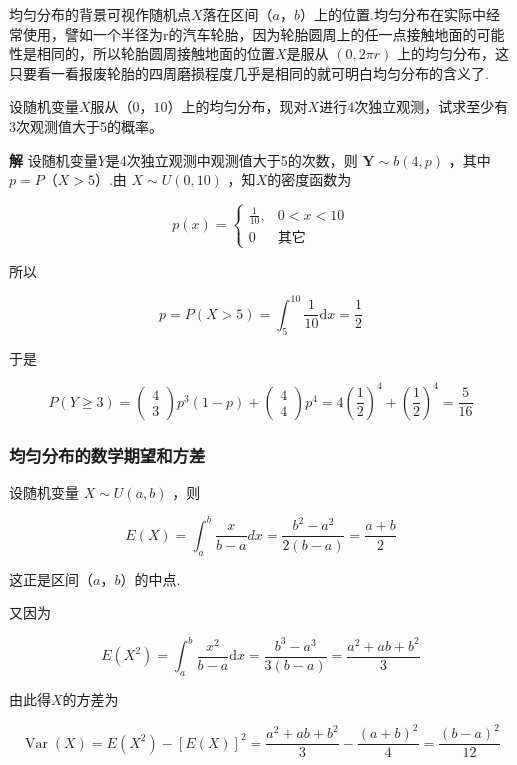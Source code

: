 均匀分布的背景可视作随机点$ X $落在区间$ （a，b） $上的位置.均匀分布在实际中经常使用，譬如一个半径为r的汽车轮胎，因为轮胎圆周上的任一点接触地面的可能性是相同的，所以轮胎圆周接触地面的位置$ X $是服从 $(0,2 \pi r)$ 上的均匀分布，这只要看一看报废轮胎的四周磨损程度几乎是相同的就可明白均匀分布的含义了.

\begin{example}
	设随机变量$ X $服从$ （0，10） $上的均匀分布，现对$ X $进行4次独立观测，试求至少有3次观测值大于5的概率。
	
	\textbf{解} 设随机变量$ Y $是4次独立观测中观测值大于5的次数，则 $\mathbf{Y} \sim b(4, p)$ ，其中$ p=P（X>5） $.由 $X \sim U(0,10)$ ，知$ X $的密度函数为
	
	\[
	p(x)=\left\{
	\begin{array}{ll}
	{\frac{1}{10},} & {0<x<10} \\ 
	{0}             & {\text{其它}}
	\end{array}\right.
	\]
	
	所以
	
	\[
	p=P(X>5)=\int_{5}^{10} \frac{1}{10} \mathrm{d} x=\frac{1}{2}
	\]
	
	于是
	
	\[
	P(Y \geqslant 3)=\left( \begin{array}{l}{4} \\ {3}\end{array}\right) p^{3}(1-p)+\left( \begin{array}{l}{4} \\ {4}\end{array}\right) p^{4}=4\left(\frac{1}{2}\right)^{4}+\left(\frac{1}{2}\right)^{4}=\frac{5}{16}
	\]
\end{example}

\subsubsection{均匀分布的数学期望和方差}

设随机变量 $X \sim U(a, b)$ ，则

\[
E(X)=\int_{a}^{b} \frac{x}{b-a} d x=\frac{b^{2}-a^{2}}{2(b-a)}=\frac{a+b}{2}
\]

这正是区间$ （a，b） $的中点.

又因为

\[
E\left(X^{2}\right)=\int_{a}^{b} \frac{x^{2}}{b-a} \mathrm{d} x=\frac{b^{3}-a^{3}}{3(b-a)}=\frac{a^{2}+a b+b^{2}}{3}
\]

由此得$ X $的方差为

\[
\operatorname{Var}(X)=E\left(X^{2}\right)-[E(X)]^{2}=\frac{a^{2}+a b+b^{2}}{3}-\frac{(a+b)^{2}}{4}=\frac{(b-a)^{2}}{12}
\]

